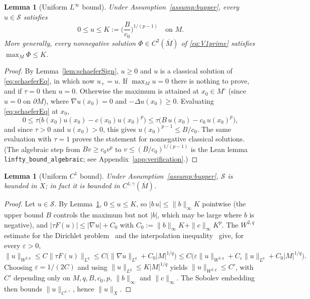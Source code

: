 \documentclass[11pt]{article}
\theoremstyle{plain}
\newtheorem{lemma}[theorem]{Lemma}
\theoremstyle{definition}
\theoremstyle{remark}
\begin{document}
\begin{lemma}[Uniform \(L^\infty\) bound]\label{lem:LinftyBound}
Under Assumption~\ref{assump:bupper}, every \(u\in\mathcal S\) satisfies
\[
0\le u\le K:=\Big(\frac{B}{c_0}\Big)^{1/(p-1)}\quad\text{on }M .
\]
More generally, every nonnegative solution \(\Phi\in C^2(\overline M)\) of \eqref{eq:V1prime} satisfies \(\max_M\Phi\le K\).
\end{lemma}
\begin{proof}
By Lemma~\ref{lem:schaeferSign}, \(u\ge 0\) and \(u\) is a classical solution of \eqref{eq:schaeferEq}, in which now \(u_+=u\). If \(\max_M u=0\) there is nothing to prove, and if \(\tau=0\) then \(u=0\). Otherwise the maximum is attained at \(x_0\in M^\circ\) (since \(u=0\) on \(\partial M\)), where \(\nabla u(x_0)=0\) and \(-\Delta u(x_0)\ge 0\). Evaluating \eqref{eq:schaeferEq} at \(x_0\),
\[
0\le \tau\big(b(x_0)u(x_0)-c(x_0)u(x_0)^p\big)\le\tau\big(B\,u(x_0)-c_0\,u(x_0)^p\big),
\]
and since \(\tau>0\) and \(u(x_0)>0\), this gives \(u(x_0)^{p-1}\le B/c_0\). The same evaluation with \(\tau=1\) proves the statement for nonnegative classical solutions. (The algebraic step from \(Bv\ge c_0v^p\) to \(v\le (B/c_0)^{1/(p-1)}\) is the Lean lemma \texttt{linfty\_bound\_algebraic}; see Appendix~\ref{app:verification}.)
\end{proof}

\begin{lemma}[Uniform \(C^1\) bound]\label{lem:C1alphaBound}
Under Assumption~\ref{assump:bupper}, \(\mathcal S\) is bounded in \(X\); in fact it is bounded in \(C^{1,\gamma}(\overline M)\).
\end{lemma}
\begin{proof}
Let \(u\in\mathcal S\). By Lemma~\ref{lem:LinftyBound}, \(0\le u\le K\), so \(|b\,u|\le\|b\|_\infty K\) pointwise (the upper bound \(B\) controls the maximum but not \(|b|\), which may be large where \(b\) is negative), and \(|\tau F(u)|\le |\nabla u|+C_0\) with \(C_0:=\|b\|_\infty K+\|c\|_\infty K^p\). The \(W^{2,q}\) estimate for the Dirichlet problem~\cite[Lem.~9.17]{GilbargTrudinger2001} and the interpolation inequality~\cite[Thm.~7.28]{GilbargTrudinger2001} give, for every \(\varepsilon>0\),
\[
\|u\|_{W^{2,q}}\le C\|\tau F(u)\|_{L^q}\le C\big(\|\nabla u\|_{L^q}+C_0|M|^{1/q}\big)
\le C\big(\varepsilon\|u\|_{W^{2,q}}+C_\varepsilon\|u\|_{L^q}+C_0|M|^{1/q}\big).
\]
Choosing \(\varepsilon=1/(2C)\) and using \(\|u\|_{L^q}\le K|M|^{1/q}\) yields \(\|u\|_{W^{2,q}}\le C'\), with \(C'\) depending only on \(M,q,B,c_0,p\), \(\|b\|_\infty\) and \(\|c\|_\infty\). The Sobolev embedding then bounds \(\|u\|_{C^{1,\gamma}}\), hence \(\|u\|_X\).
\end{proof}
\end{document}
